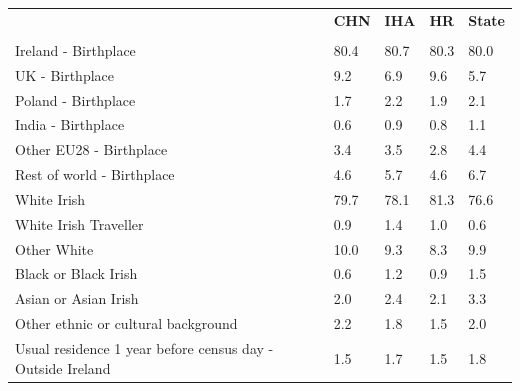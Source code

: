 \documentclass{article}
\begin{document}
\pagebreak
\begin{table}[h]	
\centering
		\begin{tabular}{KTTTT}
  \hline
& \textbf{CHN} & \textbf{IHA} & \textbf{HR}& \textbf{State}\\ 
  \hline
    \\ 
    \hline
Ireland - Birthplace & 80.4& 80.7& 80.3& 80.0\\
UK - Birthplace & 9.2& 6.9& 9.6& 5.7\\
Poland - Birthplace & 1.7& 2.2& 1.9& 2.1\\
India - Birthplace & 0.6& 0.9& 0.8& 1.1\\
Other EU28 - Birthplace & 3.4& 3.5& 2.8& 4.4\\
Rest of world - Birthplace & 4.6& 5.7& 4.6& 6.7\\
    \hline
White Irish & 79.7& 78.1& 81.3& 76.6\\
White Irish Traveller & 0.9& 1.4& 1.0& 0.6\\
Other White & 10.0&  9.3&  8.3&  9.9\\
Black or Black Irish & 0.6& 1.2& 0.9& 1.5\\
Asian or Asian Irish & 2.0& 2.4& 2.1& 3.3\\
Other ethnic or cultural background & 2.2& 1.8& 1.5& 2.0\\
    \hline
Usual residence 1 year before census day - Outside Ireland & 1.5& 1.7& 1.5& 1.8\\


\end{tabular}
\end{table}
\end{document}
